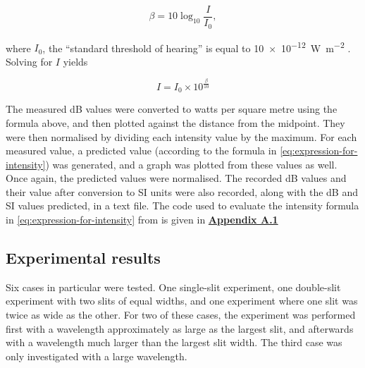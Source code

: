 \documentclass{paper}
\begin{document}
\begin{equation*}
    \beta = 10\log_{10}\frac{I}{I_0},
\end{equation*}
                
where $I_0$, the \enquote{standard threshold of hearing} is equal to \SI{10e-12}{\watt\per\square\m} \parencite{decibel-to-intensity}.
Solving for $I$ yields

\begin{equation}
\label{eq:intensity-to-decibel}
    I = I_{0} \times 10^{\frac{\beta}{10}}
\end{equation}

The measured dB values were converted to watts per square metre using the formula above,
and then plotted against the distance from the midpoint. They were then normalised by dividing each
intensity value by the maximum. For each measured value, a predicted value (according to the formula in 
\eqref{eq:expression-for-intensity}) was generated, and a graph was plotted from these values as well.
Once again, the predicted values were normalised. The recorded dB values and their value after conversion to
SI units were also recorded, along with the dB and SI values predicted, in a text file. The code used
to evaluate the intensity formula in \eqref{eq:expression-for-intensity} from  is given in \textbf{\hyperref[appendix:diffraction-free-code]{Appendix A.1}}

\subsection{Experimental results}
\label{section:experimental-results}
Six cases in particular were tested. One single-slit experiment, one double-slit
experiment with two slits of equal widths, and one experiment where one slit was twice
as wide as the other. For two of these cases, the experiment was performed first with
a wavelength approximately as large as the largest slit, and afterwards with a wavelength much
larger than the largest slit width. The third case was only investigated with a large wavelength.
\end{document}
